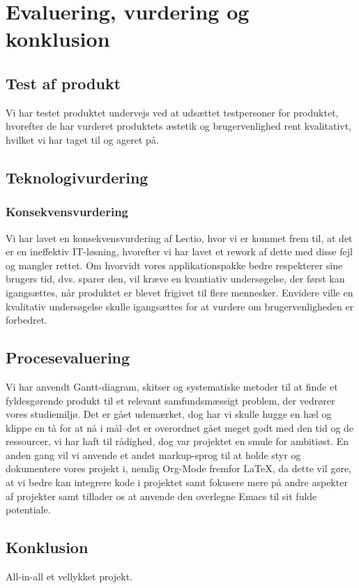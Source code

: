 \section{Evaluering, vurdering og konklusion \label{sec:konklusion}}
\subsection{Test af produkt}
Vi har testet produktet undervejs ved at udsættet testpersoner for produktet, hvorefter de har vurderet produktets æstetik og brugervenlighed rent kvalitativt, 
hvilket vi har taget til og ageret på.
\subsection{Teknologivurdering}
\subsubsection{Konsekvensvurdering}
Vi har lavet en konsekvensvurdering af Lectio, hvor vi er kommet frem til, at det er en ineffektiv IT-løsning, hvorefter vi har lavet et rework af dette med disse fejl og mangler rettet. Om hvorvidt vores applikationspakke bedre respekterer sine brugers tid, dvs. sparer den, vil kræve en kvantiativ undersøgelse, der først kan igangsættes, når produktet er blevet frigivet til flere mennesker. Envidere ville en kvalitativ undersøgelse skulle igangsættes for at vurdere om brugervenligheden er forbedret.
\subsection{Procesevaluering}
Vi har anvendt Gantt-diagram, skitser og systematiske metoder til at finde et fyldesgørende produkt til et relevant samfundsmæssigt problem, der vedrører vores studiemiljø. Det er gået udemærket, dog har vi skulle hugge en hæl og klippe en tå for at nå i mål--det er overordnet gået meget godt med den tid og de ressourcer, vi har haft til rådighed, dog var projektet en smule for ambitiøst. En anden gang vil vi anvende et andet markup-sprog til at holde styr og dokumentere vores projekt i, nemlig Org-Mode fremfor \LaTeX, da dette vil gøre, at vi bedre kan integrere kode i projektet samt fokusere mere på andre aspekter af projekter samt tillader os at anvende den overlegne Emacs til sit fulde potentiale. 
\subsection{Konklusion}
All-in-all et vellykket projekt.